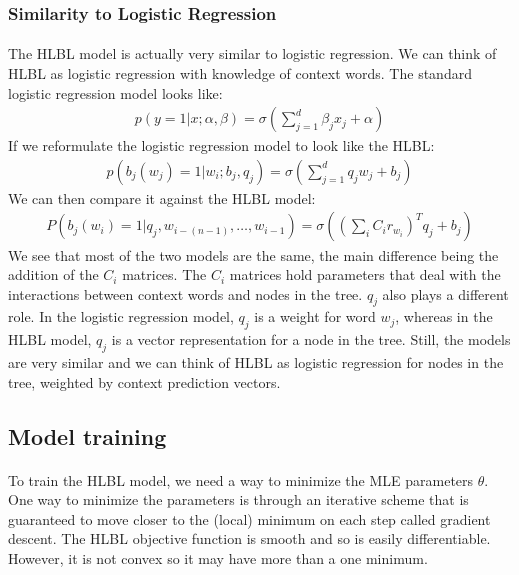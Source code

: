 \subsubsection{Similarity to Logistic Regression}
\paragraph{}
The HLBL model is actually very similar to logistic regression. We can think of HLBL as logistic regression with knowledge of context words. 
The standard logistic regression model looks like:
\begin{align}
p(y =1 | x; \alpha, \beta) = \sigma \left( \sum_{j=1}^d \beta_j x_j + \alpha \right)
\end{align}
If we reformulate the logistic regression model to look like the HLBL:
\begin{align}
p( b_j(w_j) = 1 | w_i; b_j, q_j) = \sigma \left( \sum_{j=1}^d q_j w_j + b_j \right)
\end{align}
We can then compare it against the HLBL model:
\begin{align}
P(b_j(w_i) = 1 | q_j, w_{i-(n-1)},\dots, w_{i-1}) =  \sigma( (\sum_i C_i r_{w_i})^T q_{j} +b_{j})
\end{align}
We see that most of the two models are the same, the main difference being the addition of the $C_i$ matrices.  The $C_i$ matrices hold parameters that deal with the interactions between context words and nodes in the tree. $q_j$ also plays a different role. In the logistic regression model, $q_j$ is a weight for word $w_j$, whereas in the HLBL model, $q_j$ is a vector representation for a node in the tree. Still, the models are very similar and we can think of HLBL as logistic regression for nodes in the tree, weighted by context prediction vectors.


\subsection{Model training}
\paragraph{}
To train the HLBL model, we need a way to minimize the MLE parameters $\hat{\theta}$. One way to minimize the parameters is through an iterative scheme that is guaranteed to move closer to the (local) minimum on each step called gradient descent. The HLBL objective function is smooth and so is easily differentiable. However, it is not convex so it may have more than a one minimum. 
